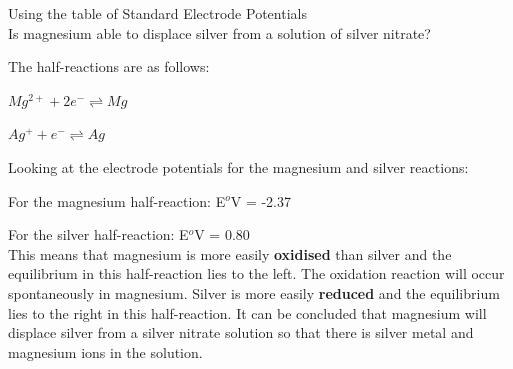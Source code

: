\begin{wex}{Using the table of Standard Electrode Potentials\\}{
Is magnesium able to displace silver from a solution of silver nitrate?}
{ %


The half-reactions are as follows:

\rm${Mg^{2+} + 2e^{-} \rightleftharpoons Mg}$

\rm${Ag^{+} + e^{-} \rightleftharpoons Ag}$\\


Looking at the electrode potentials for the magnesium and silver reactions: 

For the magnesium half-reaction: E$^{o}$V = -2.37

For the silver half-reaction: E$^{o}$V = 0.80\\

This means that magnesium is more easily \textbf{oxidised} than silver and the equilibrium in this half-reaction lies to the left. The oxidation reaction will occur spontaneously in magnesium. Silver is more easily \textbf{reduced} and the equilibrium lies to the right in this half-reaction. It can be concluded that magnesium will displace silver from a silver nitrate solution so that there is silver metal and magnesium ions in the solution.
}
\end{wex}

